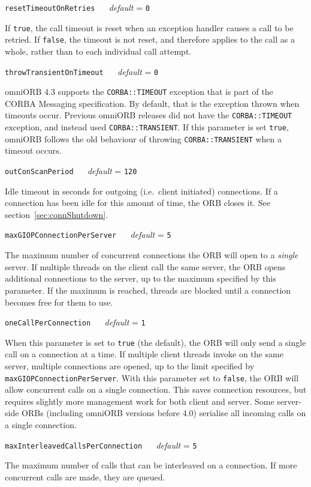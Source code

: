 \documentclass[11pt,oneside,a4paper]{book}
\makeatletter
\newcommand{\code}[1]{\texttt{#1}}
\newcommand{\confopt}[2]
  {\vspace{\baselineskip}\par\noindent\code{#1} ~~ \textit{default} =
   \code{#2}}
\renewcommand{\confopt}[2]
  {\vspace{\baselineskip}\par\noindent\code{#1} ~~ \textit{default} =
   \code{#2}\\[-1ex]\@afterheading}
\newcommand{\dsc}{\discretionary{}{}{}}
\makeatother
\begin{document}
\confopt{resetTimeoutOnRetries}{0}

If \code{true}, the call timeout is reset when an exception handler
causes a call to be retried. If \code{false}, the timeout is not
reset, and therefore applies to the call as a whole, rather than to
each individual call attempt.

\confopt{throwTransientOnTimeout}{0}

omniORB 4.3 supports the \code{CORBA::TIMEOUT} exception that is part
of the CORBA Messaging specification. By default, that is the
exception thrown when timeouts occur. Previous omniORB releases did
not have the \code{CORBA::TIMEOUT} exception, and instead used
\code{CORBA::TRANSIENT}. If this parameter is set \code{true}, omniORB
follows the old behaviour of throwing \code{CORBA::TRANSIENT} when a
timeout occurs.


\confopt{outConScanPeriod}{120}

Idle timeout in seconds for outgoing (i.e.\ client initiated)
connections. If a connection has been idle for this amount of time,
the ORB closes it. See section~\ref{sec:connShutdown}.


\confopt{maxGIOPConnectionPerServer}{5}

The maximum number of concurrent connections the ORB will open to a
\emph{single} server. If multiple threads on the client call the same
server, the ORB opens additional connections to the server, up to the
maximum specified by this parameter. If the maximum is reached,
threads are blocked until a connection becomes free for them to use.


\confopt{oneCallPerConnection}{1}

When this parameter is set to \code{true} (the default), the ORB will
only send a single call on a connection at a time. If multiple client
threads invoke on the same server, multiple connections are opened, up
to the limit specified by
\code{maxGIOP\dsc{}ConnectionPerServer}. With this parameter set to
\code{false}, the ORB will allow concurrent calls on a single
connection. This saves connection resources, but requires slightly
more management work for both client and server. Some server-side ORBs
(including omniORB versions before 4.0) serialise all incoming calls
on a single connection.

\confopt{maxInterleavedCallsPerConnection}{5}

The maximum number of calls that can be interleaved on a connection.
If more concurrent calls are made, they are queued.
\end{document}
